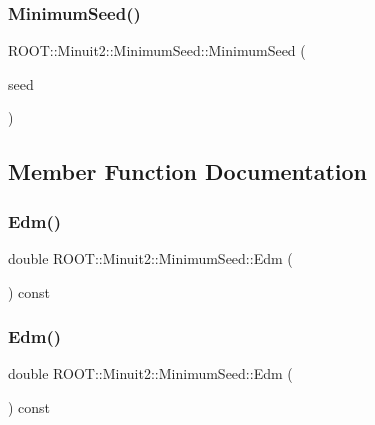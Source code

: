 \subsubsection{\texorpdfstring{MinimumSeed()}{MinimumSeed()}\hspace{0.1cm}{\footnotesize\ttfamily [4/4]}}
{\footnotesize\ttfamily R\+O\+O\+T\+::\+Minuit2\+::\+Minimum\+Seed\+::\+Minimum\+Seed (\begin{DoxyParamCaption}\item[{const \mbox{\hyperlink{classROOT_1_1Minuit2_1_1MinimumSeed}{Minimum\+Seed}} \&}]{seed }\end{DoxyParamCaption})\hspace{0.3cm}{\ttfamily [inline]}}



\subsection{Member Function Documentation}
\mbox{\label{classROOT_1_1Minuit2_1_1MinimumSeed_ab378accd110c0313557d3e916e2a9282}} 
\subsubsection{\texorpdfstring{Edm()}{Edm()}\hspace{0.1cm}{\footnotesize\ttfamily [1/2]}}
{\footnotesize\ttfamily double R\+O\+O\+T\+::\+Minuit2\+::\+Minimum\+Seed\+::\+Edm (\begin{DoxyParamCaption}{ }\end{DoxyParamCaption}) const\hspace{0.3cm}{\ttfamily [inline]}}

\mbox{\label{classROOT_1_1Minuit2_1_1MinimumSeed_ab378accd110c0313557d3e916e2a9282}} 
\subsubsection{\texorpdfstring{Edm()}{Edm()}\hspace{0.1cm}{\footnotesize\ttfamily [2/2]}}
{\footnotesize\ttfamily double R\+O\+O\+T\+::\+Minuit2\+::\+Minimum\+Seed\+::\+Edm (\begin{DoxyParamCaption}{ }\end{DoxyParamCaption}) const\hspace{0.3cm}{\ttfamily [inline]}}

